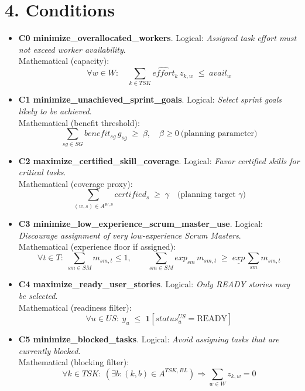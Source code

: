 \documentclass[11pt]{article}
\begin{document}
\section{4. Conditions}
\begin{itemize}[leftmargin=2em]

  \item \textbf{C0 minimize\_overallocated\_workers}. Logical: \emph{Assigned task effort must not exceed worker availability}. \\
  Mathematical (capacity):
  \[
    \forall w\in W:\quad \sum_{k\in TSK} \widehat{effort}_k \, z_{k,w} \;\le\; avail_w
  \]

  \item \textbf{C1 minimize\_unachieved\_sprint\_goals}. Logical: \emph{Select sprint goals likely to be achieved}. \\
  Mathematical (benefit threshold):
  \[
    \sum_{sg\in SG} benefit_{sg}\, g_{sg} \;\ge\; \beta,\quad \beta\ge 0\ \text{(planning parameter)}
  \]

  \item \textbf{C2 maximize\_certified\_skill\_coverage}. Logical: \emph{Favor certified skills for critical tasks}. \\
  Mathematical (coverage proxy):
  \[
    \sum_{(w,s)\in A^{W,S}} certified_s \;\ge\; \gamma \quad \text{(planning target $\gamma$)}
  \]

  \item \textbf{C3 minimize\_low\_experience\_scrum\_master\_use}. Logical: \emph{Discourage assignment of very low-experience Scrum Masters}. \\
  Mathematical (experience floor if assigned):
  \[
    \forall t\in T:\ \sum_{sm\in SM} m_{sm,t} \le 1,\qquad \sum_{sm\in SM} exp_{sm}\, m_{sm,t} \;\ge\; \underline{exp}\,\sum_{sm} m_{sm,t}
  \]

  \item \textbf{C4 maximize\_ready\_user\_stories}. Logical: \emph{Only READY stories may be selected}. \\
  Mathematical (readiness filter):
  \[
    \forall u\in US:\ y_u \;\le\; \mathbf{1}[status^{US}_u=\text{READY}]
  \]

  \item \textbf{C5 minimize\_blocked\_tasks}. Logical: \emph{Avoid assigning tasks that are currently blocked}. \\
  Mathematical (blocking filter):
  \[
    \forall k\in TSK:\ \left(\exists b:(k,b)\in A^{TSK,BL}\right) \Rightarrow \sum_{w\in W} z_{k,w} = 0
  \]


\end{itemize}
\end{document}
